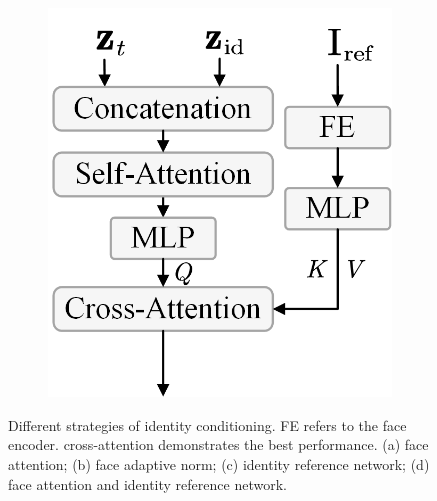 \begin{figure}[t!]
\begin{minipage}[b]{0.32\textwidth}
\begin{minipage}[b]{\textwidth}
\begin{subfigure}{0.30\linewidth}
                \includegraphics[width=\linewidth]{figs/RefCondition/VAE_CA.png}  
                \caption{}  
                \label{fig:RefConditionVAECA}  
            \end{subfigure}%
             \label{fig:RefCondition}
             \vspace{-1mm}
            \caption{{Different strategies of identity conditioning. FE refers to the face encoder. cross-attention demonstrates the best performance. (a) face attention; (b) face adaptive norm; (c) identity reference network; (d) face attention and identity reference network.}}
            \label{fig:IdCondition}
        \end{minipage}
    \end{minipage}
\end{figure}


 

